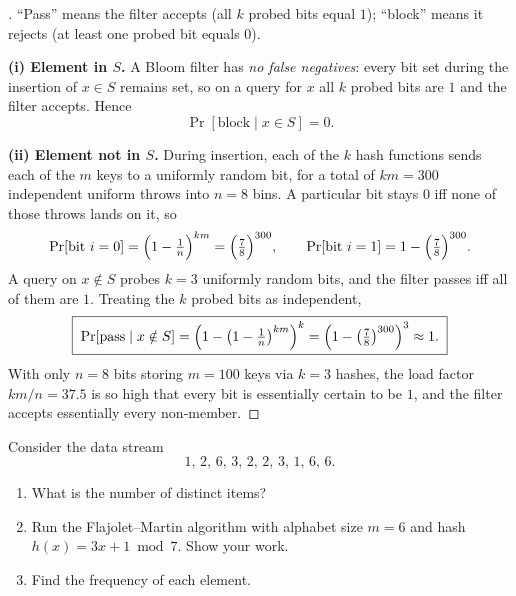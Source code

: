 \documentclass[en,hazy,blue,12pt,normal]{../../elegantnote}
\begin{document}
\begin{proof}[\solutionname]
``Pass'' means the filter accepts (all $k$ probed bits equal $1$); ``block'' means it rejects (at least one probed bit equals $0$).

\textbf{(i) Element in $S$.} A Bloom filter has \emph{no false negatives}: every bit set during the insertion of $x\in S$ remains set, so on a query for $x$ all $k$ probed bits are $1$ and the filter accepts. Hence
\[
\Pr[\text{block}\mid x\in S]=0.
\]

\textbf{(ii) Element not in $S$.}
During insertion, each of the $k$ hash functions sends each of the $m$ keys to a uniformly random bit, for a total of $km=300$ independent uniform throws into $n=8$ bins. A particular bit stays $0$ iff none of those throws lands on it, so
\[
\Pr[\text{bit }i=0]=\Bigl(1-\tfrac{1}{n}\Bigr)^{km}=\Bigl(\tfrac{7}{8}\Bigr)^{300},
\qquad
\Pr[\text{bit }i=1]=1-\Bigl(\tfrac{7}{8}\Bigr)^{300}.
\]
A query on $x\notin S$ probes $k=3$ uniformly random bits, and the filter passes iff all of them are $1$. Treating the $k$ probed bits as independent,
\[
\boxed{\;\Pr[\text{pass}\mid x\notin S]=\Bigl(1-\bigl(1-\tfrac{1}{n}\bigr)^{km}\Bigr)^{k}=\Bigl(1-\bigl(\tfrac{7}{8}\bigr)^{300}\Bigr)^{3}\approx 1.\;}
\]
With only $n=8$ bits storing $m=100$ keys via $k=3$ hashes, the load factor $km/n=37.5$ is so high that every bit is essentially certain to be $1$, and the filter accepts essentially every non-member.
\end{proof}

\begin{homework}
Consider the data stream
\[
1,\,2,\,6,\,3,\,2,\,2,\,3,\,1,\,6,\,6.
\]
\begin{enumerate}
    \item[(a)] What is the number of distinct items?
    \item[(b)] Run the Flajolet–Martin algorithm with alphabet size $m=6$ and hash $h(x)=3x+1\bmod 7$. Show your work.
    \item[(c)] Find the frequency of each element.
\end{enumerate}
\end{homework}
\end{document}
